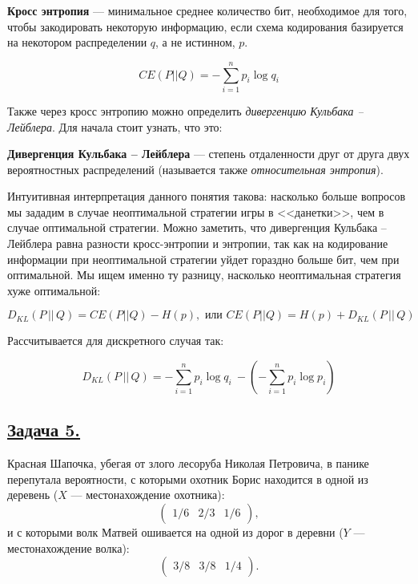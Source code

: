 \begin{siderules}
    \textbf{Кросс энтропия} --- минимальное среднее количество бит, необходимое для того, чтобы закодировать некоторую информацию, если схема кодирования базируется на некотором распределении $q$, а не истинном, $p$.
\end{siderules}

\[CE(P||Q)=-\sum\limits_{i=1}^{n}p_i\log q_i \]

Также через кросс энтропию можно определить \textit{дивергенцию Кульбака -- Лейблера}. Для начала стоит узнать, что это:

\begin{siderules}
    \textbf{Дивергенция Кульбака -- Лейблера} --- степень отдаленности друг от друга двух вероятностных распределений (называется также \textit{относительная энтропия}). \end{siderules}
    
    Интуитивная интерпретация данного понятия такова: насколько больше вопросов мы зададим в случае неоптимальной стратегии игры в <<данетки>>, чем в случае оптимальной стратегии. Можно заметить, что дивергенция Кульбака -- Лейблера равна разности кросс-энтропии и энтропии, так как на кодирование информации при неоптимальной стратегии уйдет гораздно больше бит, чем при оптимальной. Мы ищем именно ту разницу, насколько неоптимальная стратегия хуже оптимальной: 
    
    \[D_{KL}(P\, ||\, Q)= CE(P||Q) - H(p), \text{ или } CE(P||Q)=H(p)+D_{KL}(P\, || \, Q)\]
    
    Рассчитывается для дискретного случая так:

    \[D_{KL}(P\, ||\, Q)=  - \sum\limits_{i=1}^n p_i\log q_i\ - ( - \sum\limits_{i=1}^n p_i\log p_i)\]



\subsection*{\hyperref[sec:sol_problem5]{Задача 5.}}\label{sec:problem5} Красная Шапочка, убегая от злого лесоруба Николая Петровича, в панике перепутала вероятности, с которыми охотник Борис находится в одной из деревень ($X$ --- местонахождение охотника):
\[\begin{pmatrix}
    1/6 & 2/3 & 1/6
\end{pmatrix} , \] и с которыми волк Матвей ошивается на одной из дорог в деревни ($Y$ --- местонахождение волка):
\[\begin{pmatrix}
    3/8 & 3/8 & 1/4 
\end{pmatrix} .\]

